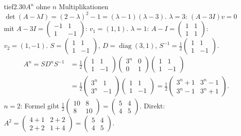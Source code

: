 \begin{loesungkarte}{tief}{2.30}{$A^{n}$ ohne $n$ Multiplikationen}
$\det(A - \lambda I) = (2 - \lambda)^{2} - 1 = (\lambda - 1)(\lambda - 3)$. $\lambda = 3$: $(A - 3I)v = 0$ mit $A - 3I = \begin{pmatrix}-1 & 1\\ 1 & -1\end{pmatrix}$: $v_1 = (1, 1)$. $\lambda = 1$: $A - I = \begin{pmatrix}1 & 1\\ 1 & 1\end{pmatrix}$: $v_2 = (1, -1)$.
$S = \begin{pmatrix}1 & 1\\ 1 & -1\end{pmatrix}$, $D = \operatorname{diag}(3, 1)$, $S^{-1} = \frac12\begin{pmatrix}1 & 1\\ 1 & -1\end{pmatrix}$.
\begin{align*}
A^{n} = SD^{n}S^{-1} &= \frac12\begin{pmatrix}1 & 1\\ 1 & -1\end{pmatrix}\begin{pmatrix}3^{n} & 0\\ 0 & 1\end{pmatrix}\begin{pmatrix}1 & 1\\ 1 & -1\end{pmatrix}\\
&= \frac12\begin{pmatrix}3^{n} & 1\\ 3^{n} & -1\end{pmatrix}\begin{pmatrix}1 & 1\\ 1 & -1\end{pmatrix} = \frac12\begin{pmatrix}3^{n} + 1 & 3^{n} - 1\\ 3^{n} - 1 & 3^{n} + 1\end{pmatrix}.
\end{align*}
$n = 2$: Formel gibt $\frac12\begin{pmatrix}10 & 8\\ 8 & 10\end{pmatrix} = \begin{pmatrix}5 & 4\\ 4 & 5\end{pmatrix}$. Direkt: $A^{2} = \begin{pmatrix}4 + 1 & 2 + 2\\ 2 + 2 & 1 + 4\end{pmatrix} = \begin{pmatrix}5 & 4\\ 4 & 5\end{pmatrix}$. \checkmark

\end{loesungkarte}
